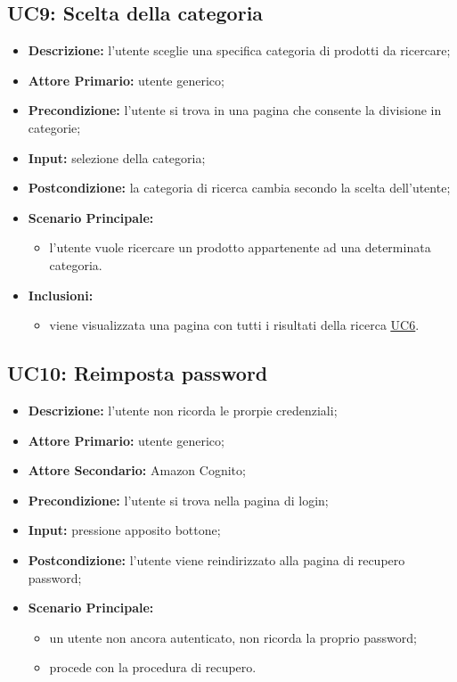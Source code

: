         \subsection{UC9: Scelta della categoria}
        \label{sec:UC9}
        \begin{itemize}
            \item \textbf{Descrizione:} l'utente sceglie una specifica categoria di prodotti da ricercare;
            \item \textbf{Attore Primario:} utente generico;
            \item \textbf{Precondizione:} l'utente si trova in una pagina che consente la divisione in categorie;
            \item \textbf{Input:} selezione della categoria;
            \item \textbf{Postcondizione:} la categoria di ricerca cambia secondo la scelta dell'utente;
            \item \textbf{Scenario Principale:}
            \begin{itemize}
                \item l'utente vuole ricercare un prodotto appartenente ad una determinata categoria.
            \end{itemize} 
            \item \textbf{Inclusioni:}
            \begin{itemize}
                \item viene visualizzata una pagina con tutti i risultati della ricerca \hyperref[sec:UC6]{\underline{UC6}}.
            \end{itemize}
        \end{itemize}
        \subsection{UC10: Reimposta password}
        \label{sec:UC10}
        \begin{itemize}
            \item \textbf{Descrizione:} l'utente non ricorda le prorpie credenziali;
            \item \textbf{Attore Primario:} utente generico;
            \item \textbf{Attore Secondario:} Amazon Cognito;
            \item \textbf{Precondizione:} l'utente si trova nella pagina di login;
            \item \textbf{Input:} pressione apposito bottone;
            \item \textbf{Postcondizione:} l'utente viene reindirizzato alla pagina di recupero password;
            \item \textbf{Scenario Principale:}
            \begin{itemize}
                \item un utente non ancora autenticato, non ricorda la proprio password;
                \item procede con la procedura di recupero.
            \end{itemize}
        \end{itemize}
